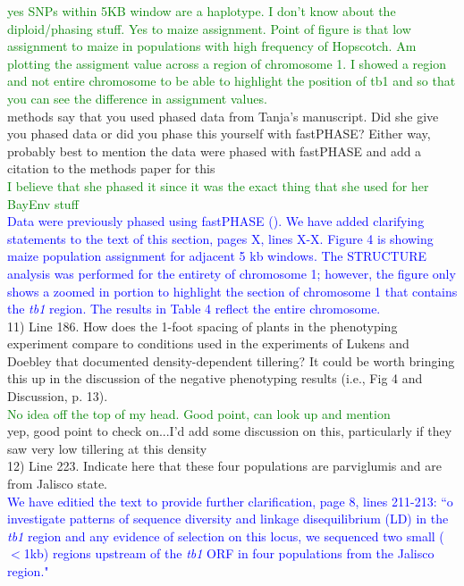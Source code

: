 \documentclass[11pt]{article}
\newcommand{\res}[1]{\noindent \textcolor{blue}{{#1}} \\}
\newcommand{\lev}[1]{\noindent \textcolor{green}{{#1}} \\}
\newcommand{\mbh}[1]{\noindent \textcolor{Dandelion}{{#1}}\\}
\begin{document}
\lev{yes SNPs within 5KB window are a haplotype. I don't know about the diploid/phasing stuff. Yes to maize assignment. Point of figure is that low assignment to maize in populations with high frequency of Hopscotch. Am plotting the assigment value across a region of chromosome 1. I showed a region and not entire chromosome to be able to highlight the position of tb1 and so that you can see the difference in assignment values.}

\mbh{methods say that you used phased data from Tanja's manuscript.  Did she give you phased data or did you phase this yourself with fastPHASE?  Either way, probably best to mention the data were phased with fastPHASE and add a citation to the methods paper for this}

\lev{I believe that she phased it since it was the exact thing that she used for her BayEnv stuff}

\res{Data were previously phased using fastPHASE (\lef{cite tanja and fastPHASE paper}). We have added clarifying statements to the text of this section, pages X, lines X-X. Figure 4 is showing maize population assignment for adjacent 5 kb windows. The STRUCTURE analysis was performed for the entirety of chromosome 1; however, the figure only shows a zoomed in portion to highlight the section of chromosome 1 that contains the \emph{tb1} region. The results in Table 4 reflect the entire chromosome.}

11) Line 186. How does the 1-foot spacing of plants in the phenotyping experiment compare to conditions used in the experiments of Lukens and Doebley that documented density-dependent tillering? It could be worth bringing this up in the discussion of the negative phenotyping results (i.e., Fig 4 and Discussion, p. 13). \\

\lev{No idea off the top of my head. Good point, can look up and mention}

\mbh{yep, good point to check on...I'd add some discussion on this, particularly if they saw very low tillering at this density}

12) Line 223. Indicate here that these four populations are parviglumis and are from Jalisco state. \\

\res{We have editied the text to provide further clarification, page 8, lines 211-213: ``o investigate patterns of sequence diversity and linkage disequilibrium (LD) in the \emph{tb1} region and any evidence of selection on this locus, we sequenced two small ($<$1kb) regions upstream of the \emph{tb1} ORF in four populations from the Jalisco region."}
\end{document}

